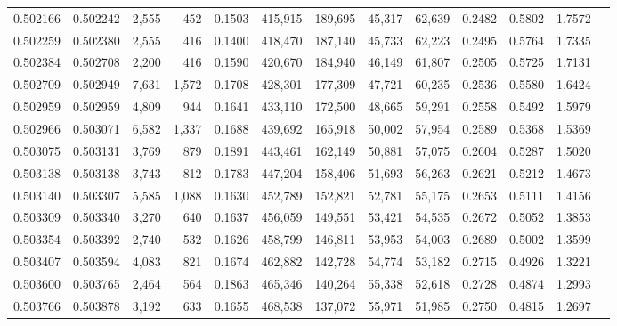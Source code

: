 \begin{tabular}{rrrrrrrrrrrrr}
0.502166 & 0.502242 &  2,555 &   452 &                                     0.1503 & 415,915 & 189,695 &  45,317 &  62,639 & 0.2482 & 0.5802 & 1.7572 \\
0.502259 & 0.502380 &  2,555 &   416 &                                     0.1400 & 418,470 & 187,140 &  45,733 &  62,223 & 0.2495 & 0.5764 & 1.7335 \\
0.502384 & 0.502708 &  2,200 &   416 &                                     0.1590 & 420,670 & 184,940 &  46,149 &  61,807 & 0.2505 & 0.5725 & 1.7131 \\
0.502709 & 0.502949 &  7,631 & 1,572 &                                     0.1708 & 428,301 & 177,309 &  47,721 &  60,235 & 0.2536 & 0.5580 & 1.6424 \\
0.502959 & 0.502959 &  4,809 &   944 &                                     0.1641 & 433,110 & 172,500 &  48,665 &  59,291 & 0.2558 & 0.5492 & 1.5979 \\
0.502966 & 0.503071 &  6,582 & 1,337 &                                     0.1688 & 439,692 & 165,918 &  50,002 &  57,954 & 0.2589 & 0.5368 & 1.5369 \\
0.503075 & 0.503131 &  3,769 &   879 &                                     0.1891 & 443,461 & 162,149 &  50,881 &  57,075 & 0.2604 & 0.5287 & 1.5020 \\
0.503138 & 0.503138 &  3,743 &   812 &                                     0.1783 & 447,204 & 158,406 &  51,693 &  56,263 & 0.2621 & 0.5212 & 1.4673 \\
0.503140 & 0.503307 &  5,585 & 1,088 &                                     0.1630 & 452,789 & 152,821 &  52,781 &  55,175 & 0.2653 & 0.5111 & 1.4156 \\
0.503309 & 0.503340 &  3,270 &   640 &                                     0.1637 & 456,059 & 149,551 &  53,421 &  54,535 & 0.2672 & 0.5052 & 1.3853 \\
0.503354 & 0.503392 &  2,740 &   532 &                                     0.1626 & 458,799 & 146,811 &  53,953 &  54,003 & 0.2689 & 0.5002 & 1.3599 \\
0.503407 & 0.503594 &  4,083 &   821 &                                     0.1674 & 462,882 & 142,728 &  54,774 &  53,182 & 0.2715 & 0.4926 & 1.3221 \\
0.503600 & 0.503765 &  2,464 &   564 &                                     0.1863 & 465,346 & 140,264 &  55,338 &  52,618 & 0.2728 & 0.4874 & 1.2993 \\
0.503766 & 0.503878 &  3,192 &   633 &                                     0.1655 & 468,538 & 137,072 &  55,971 &  51,985 & 0.2750 & 0.4815 & 1.2697 \\

\end{tabular}
